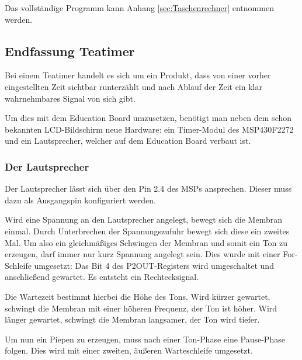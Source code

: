 \documentclass[12pt,a4paper,bibliography=totocnumbered,listof=totocnumbered]{scrartcl}
\begin{document}
Das vollständige Programm kann Anhang \ref{sec:Taschenrechner} entnommen werden.

\pagebreak

\subsection{Endfassung Teatimer}
\label{VersuchTeatimer}
Bei einem Teatimer handelt es sich um ein Produkt, dass von einer vorher eingestellten Zeit sichtbar runterzählt und nach Ablauf der Zeit ein klar wahrnehmbares Signal von sich gibt.

Um dies mit dem Education Board umzusetzen, benötigt man neben dem schon bekannten LCD-Bildschirm neue Hardware: ein Timer-Modul des MSP430F2272 und ein Lautsprecher, welcher auf dem Education Board verbaut ist.


\subsubsection{Der Lautsprecher}
\label{Lautsprecher}
Der Lautsprecher lässt sich über den Pin 2.4 des MSPs ansprechen. Dieser muss dazu als Ausgangspin konfiguriert werden.
\vspace{1em}


Wird eine Spannung an den Lautsprecher angelegt, bewegt sich die Membran einmal. Durch Unterbrechen der Spannungszufuhr bewegt sich diese ein zweites Mal. Um also ein gleichmäßiges Schwingen der Membran und somit ein Ton zu erzeugen, darf immer nur kurz Spannung angelegt sein. Dies wurde mit einer For-Schleife umgesetzt: Das Bit 4 des P2OUT-Registers wird umgeschaltet und anschließend gewartet. Es entsteht ein Rechtecksignal.

\vspace{1em}


Die Wartezeit bestimmt hierbei die Höhe des Tons. Wird kürzer gewartet, schwingt die Membran mit einer höheren Frequenz, der Ton ist höher. Wird länger gewartet, schwingt die Membran langsamer, der Ton wird tiefer.

Um nun ein Piepen zu erzeugen, muss nach einer Ton-Phase eine Pause-Phase folgen. Dies wird mit einer zweiten, äußeren Warteschleife umgesetzt.

\vspace{1em}

\end{document}
